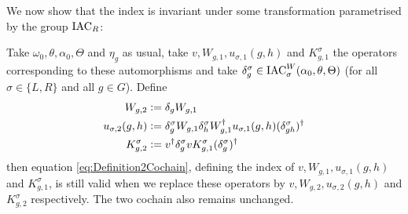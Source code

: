 \documentclass[12pt,a4paper,twoside]{article}
\numberwithin{equation}{section}
\begin{document}
We now show that the index is invariant under some transformation parametrised by the group $\textrm{IAC}_R$:
\begin{lemma}\label{lem:TransformationUnderDelta}
	Take $\omega_0,\theta,\alpha_0,\Theta$ and $\eta_g$ as usual, take $v,W_{g,1},u_{\sigma,1}(g,h)$ and $K_{g,1}^\sigma$ the operators corresponding to these automorphisms and take $\delta^\sigma_g\in\textrm{IAC}_\sigma^W(\alpha_0,\theta,\Theta)$ (for all $\sigma\in\{L,R\}$ and all $g\in G$). Define
	\begin{align}
		W_{g,2}&\vcentcolon=\delta_g W_{g,1}\\
		u_{\sigma,2}(g,h)&\vcentcolon= \delta_g^\sigma W_{g,1}\delta_h^\sigma W_{g,1}^\dagger u_{\sigma,1}(g,h)(\delta_{gh}^\sigma)^\dagger\\
		K^\sigma_{g,2}&\vcentcolon= v^\dagger \delta_g^\sigma v K_{g,1}^\sigma (\delta_g^\sigma)^\dagger
	\end{align}
	then equation \eqref{eq:Definition2Cochain}, defining the index of $v,W_{g,1},u_{\sigma,1}(g,h)$ and $K_{g,1}^\sigma$, is still valid when we replace these operators by $v,W_{g,2},u_{\sigma,2}(g,h)$ and $K_{g,2}^\sigma$ respectively. The two cochain also remains unchanged.
\end{lemma}
\end{document}
